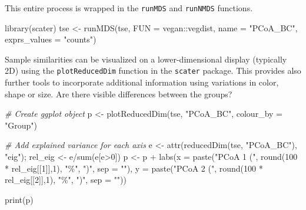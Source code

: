 \documentclass[
]{book}
\newenvironment{Shaded}{\begin{snugshade}}{\end{snugshade}}
\newcommand{\AttributeTok}[1]{\textcolor[rgb]{0.77,0.63,0.00}{#1}}
\newcommand{\CommentTok}[1]{\textcolor[rgb]{0.56,0.35,0.01}{\textit{#1}}}
\newcommand{\DecValTok}[1]{\textcolor[rgb]{0.00,0.00,0.81}{#1}}
\newcommand{\FunctionTok}[1]{\textcolor[rgb]{0.00,0.00,0.00}{#1}}
\newcommand{\NormalTok}[1]{#1}
\newcommand{\OtherTok}[1]{\textcolor[rgb]{0.56,0.35,0.01}{#1}}
\newcommand{\SpecialCharTok}[1]{\textcolor[rgb]{0.00,0.00,0.00}{#1}}
\newcommand{\StringTok}[1]{\textcolor[rgb]{0.31,0.60,0.02}{#1}}
\begin{document}
This entire process is wrapped in the \texttt{runMDS} and \texttt{runNMDS}
functions.

\begin{Shaded}
\begin{Highlighting}[]
\FunctionTok{library}\NormalTok{(scater)}
\NormalTok{tse }\OtherTok{\textless{}{-}} \FunctionTok{runMDS}\NormalTok{(tse, }\AttributeTok{FUN =}\NormalTok{ vegan}\SpecialCharTok{::}\NormalTok{vegdist, }\AttributeTok{name =} \StringTok{"PCoA\_BC"}\NormalTok{, }\AttributeTok{exprs\_values =} \StringTok{"counts"}\NormalTok{)}
\end{Highlighting}
\end{Shaded}

Sample similarities can be visualized on a lower-dimensional display
(typically 2D) using the \texttt{plotReducedDim} function in the \texttt{scater}
package. This provides also further tools to incorporate additional
information using variations in color, shape or size. Are there
visible differences between the groups?

\begin{Shaded}
\begin{Highlighting}[]
\CommentTok{\# Create ggplot object}
\NormalTok{p }\OtherTok{\textless{}{-}} \FunctionTok{plotReducedDim}\NormalTok{(tse, }\StringTok{"PCoA\_BC"}\NormalTok{, }\AttributeTok{colour\_by =} \StringTok{"Group"}\NormalTok{)}

\CommentTok{\# Add explained variance for each axis}
\NormalTok{e }\OtherTok{\textless{}{-}} \FunctionTok{attr}\NormalTok{(}\FunctionTok{reducedDim}\NormalTok{(tse, }\StringTok{"PCoA\_BC"}\NormalTok{), }\StringTok{"eig"}\NormalTok{);}
\NormalTok{rel\_eig }\OtherTok{\textless{}{-}}\NormalTok{ e}\SpecialCharTok{/}\FunctionTok{sum}\NormalTok{(e[e}\SpecialCharTok{\textgreater{}}\DecValTok{0}\NormalTok{])          }
\NormalTok{p }\OtherTok{\textless{}{-}}\NormalTok{ p }\SpecialCharTok{+} \FunctionTok{labs}\NormalTok{(}\AttributeTok{x =} \FunctionTok{paste}\NormalTok{(}\StringTok{"PCoA 1 ("}\NormalTok{, }\FunctionTok{round}\NormalTok{(}\DecValTok{100} \SpecialCharTok{*}\NormalTok{ rel\_eig[[}\DecValTok{1}\NormalTok{]],}\DecValTok{1}\NormalTok{), }\StringTok{"\%"}\NormalTok{, }\StringTok{")"}\NormalTok{, }\AttributeTok{sep =} \StringTok{""}\NormalTok{),}
              \AttributeTok{y =} \FunctionTok{paste}\NormalTok{(}\StringTok{"PCoA 2 ("}\NormalTok{, }\FunctionTok{round}\NormalTok{(}\DecValTok{100} \SpecialCharTok{*}\NormalTok{ rel\_eig[[}\DecValTok{2}\NormalTok{]],}\DecValTok{1}\NormalTok{), }\StringTok{"\%"}\NormalTok{, }\StringTok{")"}\NormalTok{, }\AttributeTok{sep =} \StringTok{""}\NormalTok{))}

\FunctionTok{print}\NormalTok{(p)}
\end{Highlighting}
\end{Shaded}
\end{document}
